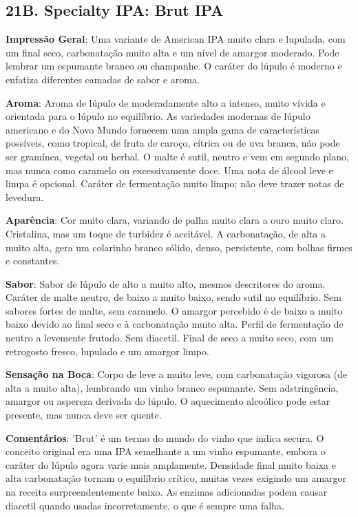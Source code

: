 \subsection*{21B. Specialty IPA: Brut IPA}
\textbf{Impressão Geral}: Uma variante de American IPA muito clara e lupulada, com um final seco, carbonatação muito alta e um nível de amargor moderado. Pode lembrar um espumante branco ou champanhe. O caráter do lúpulo é moderno e enfatiza diferentes camadas de sabor e aroma.

\textbf{Aroma}: Aroma de lúpulo de moderadamente alto a intenso, muito vívida e orientada para o lúpulo no equilíbrio. As variedades modernas de lúpulo americano e do Novo Mundo fornecem uma ampla gama de características possíveis, como tropical, de fruta de caroço, cítrica ou de uva branca, não pode ser gramínea, vegetal ou herbal. O malte é sutil, neutro e vem em segundo plano, mas nunca como caramelo ou excessivamente doce. Uma nota de álcool leve e limpa é opcional. Caráter de fermentação muito limpo; não deve trazer notas de levedura.

\textbf{Aparência}: Cor muito clara, variando de palha muito clara a ouro muito claro. Cristalina, mas um toque de turbidez é aceitável. A carbonatação, de alta a muito alta, gera um colarinho branco sólido, denso, persistente, com bolhas firmes e constantes.

\textbf{Sabor}: Sabor de lúpulo de alto a muito alto, mesmos descritores do aroma. Caráter de malte neutro, de baixo a muito baixo, sendo sutil no equilíbrio. Sem sabores fortes de malte, sem caramelo. O amargor percebido é de baixo a muito baixo devido ao final seco e à carbonatação muito alta. Perfil de fermentação de neutro a levemente frutado. Sem diacetil. Final de seco a muito seco, com um retrogosto fresco, lupulado e um amargor limpo.

\textbf{Sensação na Boca}: Corpo de leve a muito leve, com carbonatação vigorosa (de alta a muito alta), lembrando um vinho branco espumante. Sem adstringência, amargor ou aspereza derivada do lúpulo. O aquecimento alcoólico pode estar presente, mas nunca deve ser quente.

\textbf{Comentários}: 'Brut' é um termo do mundo do vinho que indica secura. O conceito original era uma IPA semelhante a um vinho espumante, embora o caráter do lúpulo agora varie mais amplamente. Densidade final muito baixa e alta carbonatação tornam o equilíbrio crítico, muitas vezes exigindo um amargor na receita surpreendentemente baixo. As enzimas adicionadas podem causar diacetil quando usadas incorretamente, o que é sempre uma falha.

